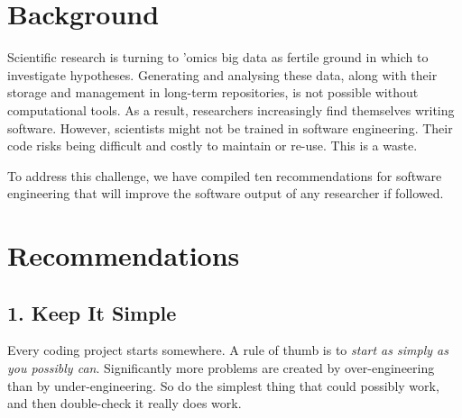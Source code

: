 \documentclass{bmcart}
\begin{document}


\section*{Background}

Scientific research is turning to 'omics big data as fertile ground in which to investigate hypotheses. Generating and analysing these data, along with their storage and management in long-term repositories, is not possible without computational tools. As a result, researchers increasingly find themselves writing software. However, scientists might not be trained in software engineering. Their code risks being difficult and costly to maintain or re-use. This is a waste.

To address this challenge, we have compiled ten recommendations for software engineering that will improve the software output of any researcher if followed. 

\section*{Recommendations}

\subsection*{1. Keep It Simple}

Every coding project starts somewhere. A rule of thumb is to \textit{start as simply as you possibly can}. Significantly more problems are created by over-engineering than by under-engineering. So do the simplest thing that could possibly work, and then double-check it really does work. 
\end{document}

